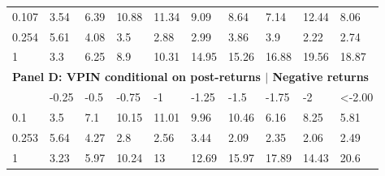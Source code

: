 \begin{table}[H]
\begin{tabular}{p{1.2cm}p{1.2cm}p{1.2cm}p{1.2cm}p{1.2cm}p{1.2cm}p{1.2cm}p{1.2cm}p{1.2cm}p{1.2cm}}
0.107&3.54&6.39&10.88&11.34&9.09&8.64&7.14&12.44&8.06\\
0.254&5.61&4.08&3.5&2.88&2.99&3.86&3.9&2.22&2.74\\
1&3.3&6.25&8.9&10.31&14.95&15.26&16.88&19.56&18.87\\
\midrule
\multicolumn{10}{p{14cm}}{\textbf{Panel D: VPIN conditional on post-returns $\vert$ Negative returns}}\\
\midrule
&  -0.25&  -0.5&  -0.75&  -1&  -1.25&  -1.5&  -1.75&  -2&  <-2.00\\
0.1&3.5&7.1&10.15&11.01&9.96&10.46&6.16&8.25&5.81\\
0.253&5.64&4.27&2.8&2.56&3.44&2.09&2.35&2.06&2.49\\
1&3.23&5.97&10.24&13&12.69&15.97&17.89&14.43&20.6\\
\bottomrule
\end{tabular}
\end{table}

\newpage
